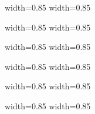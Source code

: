 \begin{frame}
      {width=0.85\textwidth} {}
      {width=0.85\textwidth} {}
\end{frame}
\begin{frame}
      {width=0.85\textwidth} {}
      {width=0.85\textwidth} {}
\end{frame}
\begin{frame}
      {width=0.85\textwidth} {}
      {width=0.85\textwidth} {}
\end{frame}
\begin{frame}
      {width=0.85\textwidth} {}
      {width=0.85\textwidth} {}
\end{frame}
\begin{frame}
      {width=0.85\textwidth} {}
      {width=0.85\textwidth} {}
\end{frame}
\begin{frame}
      {width=0.85\textwidth} {}
      {width=0.85\textwidth} {}
\end{frame}



